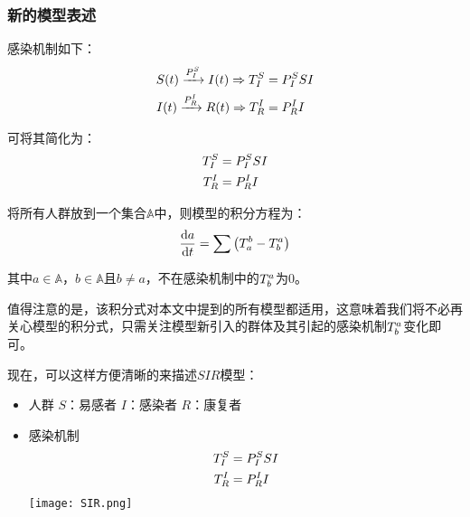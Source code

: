 \subsubsection{新的模型表述}
\par 感染机制如下：
\begin{align}
	S(t)\xrightarrow{P^{S}_{I}}I(t) \Rightarrow T^{S}_{I}&=P^{S}_{I}SI \\
	I(t)\xrightarrow{P^{I}_{R}}R(t) \Rightarrow T^{I}_{R}&=P^{I}_{R}I
\end{align}
\par 可将其简化为：
\begin{align}
	T^{S}_{I}&=P^{S}_{I}SI \\
	T^{I}_{R}&=P^{I}_{R}I
\end{align}
\par 将所有人群放到一个集合$\mathbb{A}$中，则模型的积分方程为：
\begin{equation}
	\frac{\mathrm{d}a}{\mathrm{d}t} = \sum\left(T^{b}_{a}-T^{a}_{b}\right)
\end{equation}
\par 其中$a\in\mathbb{A}$，$b\in\mathbb{A}$且$b\not=a$，不在感染机制中的$T^{a}_{b}$为$0$。
\par 值得注意的是，该积分式对本文中提到的所有模型都适用，这意味着我们将不必再关心模型的积分式，只需关注模型新引入的群体及其引起的感染机制$T^{a}_{b}$变化即可。
\par 现在，可以这样方便清晰的来描述$SIR$模型：
\begin{itemize}
	\item 人群
	      \subitem $S$：易感者
	      \subitem $I$：感染者
	      \subitem $R$：康复者
	\item 感染机制
	      \subitem
	      \begin{align}
		      T^{S}_{I}&=P^{S}_{I}SI \\
		      T^{I}_{R}&=P^{I}_{R}I
	      \end{align}
	      \texttt{[image: SIR.png]}

\end{itemize}